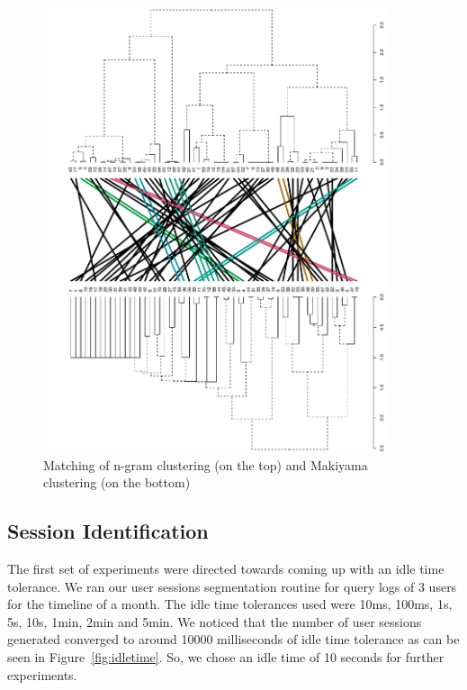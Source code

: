 \begin{figure}[h!]
    \centering
    \includegraphics[width=0.9\textwidth]{graphics/tanglegram}
    \caption{Matching of n-gram clustering (on the top) and Makiyama clustering (on the bottom)}
    \label{fig:tanglegram}
\end{figure}



\subsection{Session Identification}

The first set of experiments were directed towards coming up with an idle time tolerance. We ran our user sessions segmentation routine for query logs of 3 users for the timeline of a month. The idle time tolerances used were 10ms, 100ms, 1s, 5s, 10s, 1min, 2min and 5min. We noticed that the number of user sessions generated converged to around 10000 milliseconds of idle time tolerance as can be seen in Figure~\ref{fig:idletime}. So, we chose an idle time of 10 seconds for further experiments.

